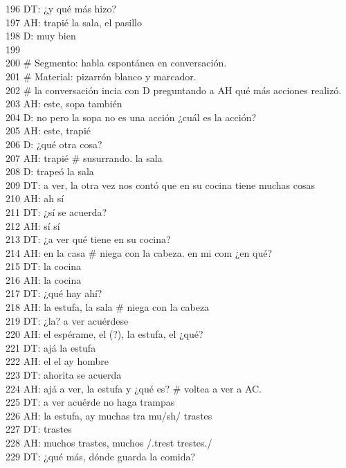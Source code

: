 196 DT: ¿y qué más hizo?\\
197 AH: trapié la sala, el pasillo\\
198 D: muy bien\\
199 \\
200 \# Segmento: habla espontánea en conversación.\\
201 \# Material: pizarrón blanco y marcador.\\
202 \# la conversación incia con D preguntando a AH qué más acciones realizó.\\
203 AH: este, sopa también\\
204 D: no pero la sopa no es una acción ¿cuál es la acción?\\
205 AH: este, trapié\\
206 D: ¿qué otra cosa?\\
207 AH: trapié \# susurrando. la sala\\
208 D: trapeó la sala\\
209 DT: a ver, la otra vez nos contó que en su cocina tiene muchas cosas\\
210 AH: ah sí\\
211 DT: ¿sí se acuerda?\\
212 AH: sí sí\\
213 DT: ¿a ver qué tiene en su cocina?\\
214 AH: en la casa \# niega con la cabeza. en mi com ¿en qué?\\
215 DT: la cocina\\
216 AH: la cocina\\
217 DT: ¿qué hay ahí?\\
218 AH: la estufa, la sala \# niega con la cabeza\\
219 DT: ¿la? a ver acuérdese\\
220 AH: el espérame, el (?), la estufa, el ¿qué?\\
221 DT: ajá la estufa\\
222 AH: el el ay hombre\\
223 DT: ahorita se acuerda\\
224 AH: ajá a ver, la estufa y ¿qué es? \# voltea a ver a AC.\\
225 DT: a ver acuérde no haga trampas\\
226 AH: la estufa, ay muchas tra mu/sh/ trastes\\
227 DT: trastes\\
228 AH: muchos trastes, muchos /.trest trestes./\\
229 DT: ¿qué más, dónde guarda la comida?\\
